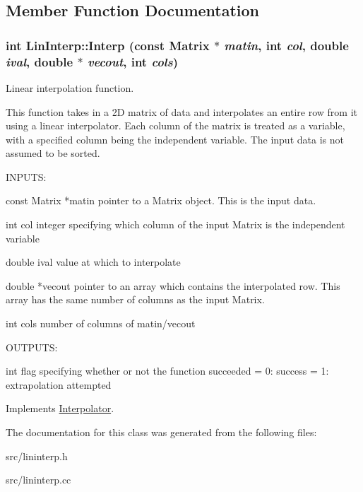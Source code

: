 \subsection{Member Function Documentation}
\hypertarget{classLinInterp_a26aeb03c387bf5c8ea5db0ed111b5cd7}{
\subsubsection[{Interp}]{\setlength{\rightskip}{0pt plus 5cm}int LinInterp::Interp (const {\bf Matrix} $\ast$ {\em matin}, \/  int {\em col}, \/  double {\em ival}, \/  double $\ast$ {\em vecout}, \/  int {\em cols})}}
\label{d8/dee/classLinInterp_a26aeb03c387bf5c8ea5db0ed111b5cd7}


Linear interpolation function. 

This function takes in a 2D matrix of data and interpolates an entire row from it using a linear interpolator. Each column of the matrix is treated as a variable, with a specified column being the independent variable. The input data is not assumed to be sorted.

\begin{DoxyVerb}
  INPUTS:

  const Matrix *matin    pointer to a Matrix object. This is the input data.

  int col                integer specifying which column of the input Matrix is the independent 
                         variable

  double ival            value at which to interpolate

  double *vecout         pointer to an array which contains the interpolated row. This array has
                         the same number of columns as the input Matrix.

  int cols               number of columns of matin/vecout


  OUTPUTS:

  int                    flag specifying whether or not the function succeeded
                         = 0: success
			 = 1: extrapolation attempted
\end{DoxyVerb}
 

Implements \hyperlink{classInterpolator_a2238defccb009047f624bda33cc47c73}{Interpolator}.



The documentation for this class was generated from the following files:\begin{DoxyCompactItemize}
\item 
src/lininterp.h\item 
src/lininterp.cc\end{DoxyCompactItemize}
